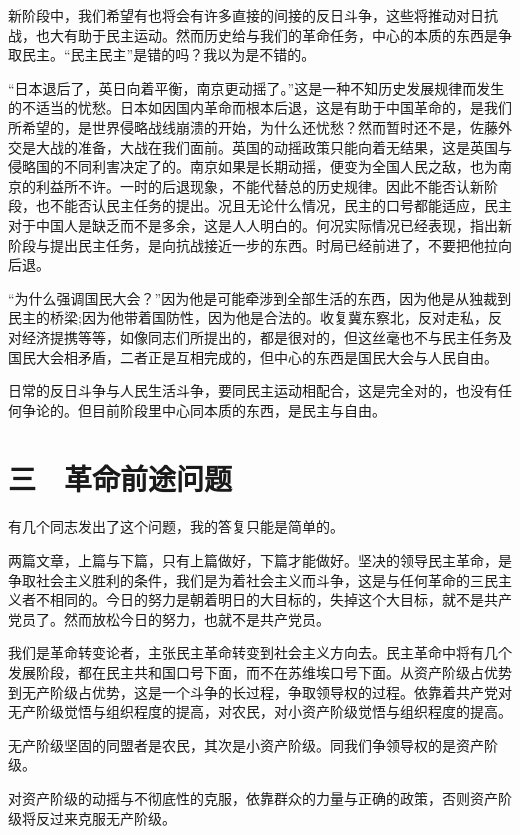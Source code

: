 新阶段中，我们希望有也将会有许多直接的间接的反日斗争，这些将推动对日抗战，也大有助于民主运动。然而历史给与我们的革命任务，中心的本质的东西是争取民主。“民主民主”是错的吗？我以为是不错的。

“日本退后了，英日向着平衡，南京更动摇了。”这是一种不知历史发展规律而发生的不适当的忧愁。日本如因国内革命而根本后退，这是有助于中国革命的，是我们所希望的，是世界侵略战线崩溃的开始，为什么还忧愁？然而暂时还不是，佐藤外交是大战的准备，大战在我们面前。英国的动摇政策只能向着无结果，这是英国与侵略国的不同利害决定了的。南京如果是长期动摇，便变为全国人民之敌，也为南京的利益所不许。一时的后退现象，不能代替总的历史规律。因此不能否认新阶段，也不能否认民主任务的提出。况且无论什么情况，民主的口号都能适应，民主对于中国人是缺乏而不是多余，这是人人明白的。何况实际情况已经表现，指出新阶段与提出民主任务，是向抗战接近一步的东西。时局已经前进了，不要把他拉向后退。

“为什么强调国民大会？”因为他是可能牵涉到全部生活的东西，因为他是从独裁到民主的桥梁;因为他带着国防性，因为他是合法的。收复冀东察北，反对走私，反对经济提携等等，如像同志们所提出的，都是很对的，但这丝毫也不与民主任务及国民大会相矛盾，二者正是互相完成的，但中心的东西是国民大会与人民自由。

日常的反日斗争与人民生活斗争，要同民主运动相配合，这是完全对的，也没有任何争论的。但目前阶段里中心同本质的东西，是民主与自由。

\section{三　革命前途问题}

有几个同志发出了这个问题，我的答复只能是简单的。

两篇文章，上篇与下篇，只有上篇做好，下篇才能做好。坚决的领导民主革命，是争取社会主义胜利的条件，我们是为着社会主义而斗争，这是与任何革命的三民主义者不相同的。今日的努力是朝着明日的大目标的，失掉这个大目标，就不是共产党员了。然而放松今日的努力，也就不是共产党员。

我们是革命转变论者，主张民主革命转变到社会主义方向去。民主革命中将有几个发展阶段，都在民主共和国口号下面，而不在苏维埃口号下面。从资产阶级占优势到无产阶级占优势，这是一个斗争的长过程，争取领导权的过程。依靠着共产党对无产阶级觉悟与组织程度的提高，对农民，对小资产阶级觉悟与组织程度的提高。

无产阶级坚固的同盟者是农民，其次是小资产阶级。同我们争领导权的是资产阶级。

对资产阶级的动摇与不彻底性的克服，依靠群众的力量与正确的政策，否则资产阶级将反过来克服无产阶级。

